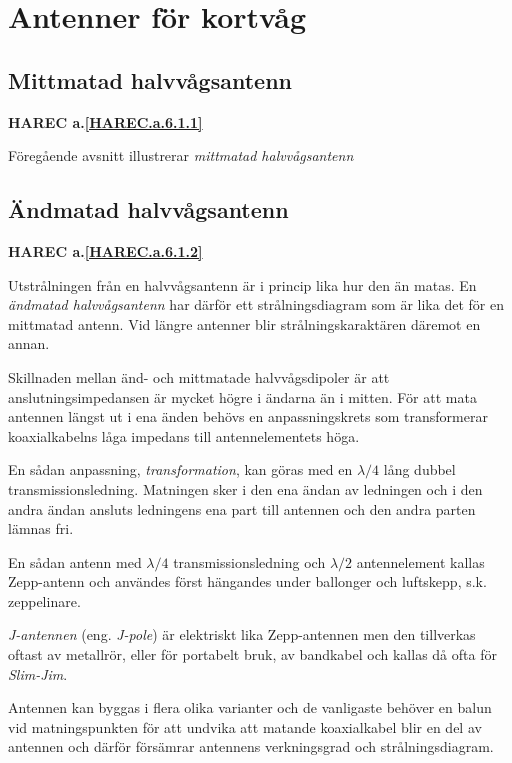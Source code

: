 \section{Antenner för kortvåg}

\subsection{Mittmatad halvvågsantenn}
\textbf{
HAREC a.\ref{HAREC.a.6.1.1}\label{myHAREC.a.6.1.1}
}

Föregående avsnitt illustrerar \emph{mittmatad halvvågsantenn}

\subsection{Ändmatad halvvågsantenn}
\textbf{
HAREC a.\ref{HAREC.a.6.1.2}\label{myHAREC.a.6.1.2}
}

Utstrålningen från en halvvågsantenn är i princip lika hur den än matas.
En \emph{ändmatad halvvågsantenn} har därför ett strålningsdiagram som är lika
det för en mittmatad antenn.
Vid längre antenner blir strålningskaraktären däremot en annan.

Skillnaden mellan änd- och mittmatade halvvågsdipoler är att
anslutningsimpedansen är mycket högre i ändarna än i mitten.
För att mata antennen längst ut i ena änden behövs en anpassningskrets som
transformerar koaxialkabelns låga impedans till antennelementets höga.

En sådan anpassning, \emph{transformation}, kan göras med en \(\lambda/4\) lång
dubbel transmissionsledning.
Matningen sker i den ena ändan av ledningen och i den andra ändan ansluts
ledningens ena part till antennen och den andra parten lämnas fri.

En sådan antenn med \(\lambda/4\) transmissionsledning och \(\lambda/2\)
antennelement kallas Zepp-antenn och användes först hängandes under ballonger
och luftskepp, s.k. zeppelinare.

\emph{J-antennen} (eng. \emph{J-pole}) \cite[J-antenne]{Rothammel2001} är
elektriskt lika Zepp-antennen men den tillverkas oftast av metallrör, eller
för portabelt bruk, av bandkabel och kallas då ofta för \emph{Slim-Jim}.

Antennen kan byggas i flera olika varianter och de vanligaste behöver en balun
vid matningspunkten för att undvika att matande koaxialkabel blir en del av
antennen och därför försämrar antennens verkningsgrad och strålningsdiagram.

